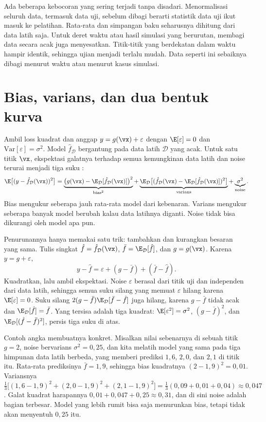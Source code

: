 Ada beberapa kebocoran yang sering terjadi tanpa disadari. Menormalisasi seluruh data, termasuk
data uji, sebelum dibagi berarti statistik data uji ikut masuk ke pelatihan. Rata-rata dan
simpangan baku seharusnya dihitung dari data latih saja. Untuk deret waktu atau hasil simulasi
yang berurutan, membagi data secara acak juga menyesatkan. Titik-titik yang berdekatan dalam
waktu hampir identik, sehingga ujian menjadi terlalu mudah. Data seperti ini sebaiknya dibagi
menurut waktu atau menurut kasus simulasi.

\section{Bias, varians, dan dua bentuk kurva}

Ambil loss kuadrat dan anggap $y=g(\vx)+\varepsilon$ dengan $\E[\varepsilon]=0$ dan
$\mathrm{Var}[\varepsilon]=\sigma^2$. Model $\hat f_{\mathcal D}$ bergantung pada data latih $\mathcal D$
yang acak. Untuk satu titik $\vx$, ekspektasi galatnya terhadap semua kemungkinan data latih dan
noise terurai menjadi tiga suku \citep{geman1992}:
\begin{equation}
\E\big[(y-\hat f_{\mathcal D}(\vx))^2\big]
=\underbrace{\big(g(\vx)-\E_{\mathcal D}[\hat f_{\mathcal D}(\vx)]\big)^2}_{\text{bias}^2}
+\underbrace{\E_{\mathcal D}\big[(\hat f_{\mathcal D}(\vx)-\E_{\mathcal D}[\hat f_{\mathcal D}(\vx)])^2\big]}_{\text{varians}}
+\underbrace{\sigma^2}_{\text{noise}}.
\end{equation}
Bias mengukur seberapa jauh rata-rata model dari kebenaran. Varians mengukur seberapa banyak
model berubah kalau data latihnya diganti. Noise tidak bisa dikurangi oleh model apa pun.

Penurunannya hanya memakai satu trik: tambahkan dan kurangkan besaran yang sama. Tulis singkat
$\hat f=\hat f_{\mathcal D}(\vx)$, $\bar f=\E_{\mathcal D}[\hat f]$, dan $g=g(\vx)$. Karena
$y=g+\varepsilon$,
\[
y-\hat f=\varepsilon+(g-\bar f)+(\bar f-\hat f).
\]
Kuadratkan, lalu ambil ekspektasi. Noise $\varepsilon$ berasal dari titik uji dan independen dari data
latih, sehingga semua suku silang yang memuat $\varepsilon$ hilang karena $\E[\varepsilon]=0$. Suku silang
$2(g-\bar f)\E_{\mathcal D}[\bar f-\hat f]$ juga hilang, karena $g-\bar f$ tidak acak dan
$\E_{\mathcal D}[\hat f]=\bar f$. Yang tersisa adalah tiga kuadrat: $\E[\varepsilon^2]=\sigma^2$,
$(g-\bar f)^2$, dan $\E_{\mathcal D}[(\hat f-\bar f)^2]$, persis tiga suku di atas.

Contoh angka membuatnya konkret. Misalkan nilai sebenarnya di sebuah titik $g=2$, noise bervarians
$\sigma^2=0{,}25$, dan kita melatih model yang sama pada tiga himpunan data latih berbeda, yang memberi
prediksi $1{,}6$, $2{,}0$, dan $2{,}1$ di titik itu. Rata-rata prediksinya $\bar f=1{,}9$, sehingga bias
kuadratnya $(2-1{,}9)^2=0{,}01$. Variansnya
$\tfrac13\big[(1{,}6-1{,}9)^2+(2{,}0-1{,}9)^2+(2{,}1-1{,}9)^2\big]=\tfrac13(0{,}09+0{,}01+0{,}04)\approx0{,}047$.
Galat kuadrat harapannya $0{,}01+0{,}047+0{,}25\approx0{,}31$, dan di sini noise adalah bagian terbesar.
Model yang lebih rumit bisa saja menurunkan bias, tetapi tidak akan menyentuh $0{,}25$ itu.

